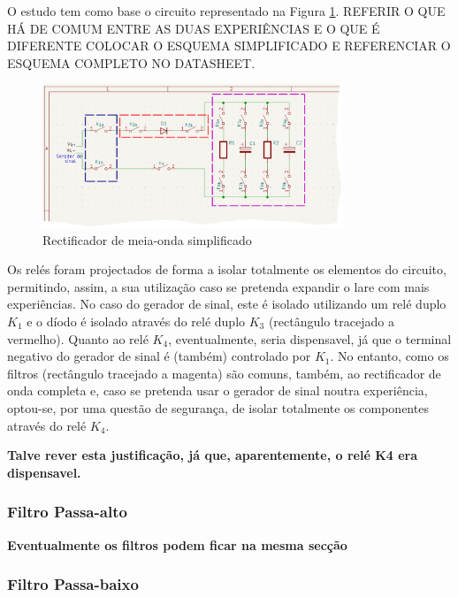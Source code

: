 O estudo tem como base o circuito representado na Figura \ref{fig:meiaondasimplificado}.
REFERIR O QUE HÁ DE COMUM ENTRE AS DUAS EXPERIÊNCIAS E O QUE É DIFERENTE
COLOCAR O ESQUEMA SIMPLIFICADO E REFERENCIAR O ESQUEMA COMPLETO NO DATASHEET.

\begin{figure}[hbtp]
	\centering
	\includegraphics[width=0.8\textwidth]{figures/MeiaOndaSimplificado.png}
	\caption{Rectificador de meia-onda simplificado}
	\label{fig:meiaondasimplificado}
\end{figure}

Os relés foram projectados de forma a isolar totalmente os elementos do circuito, permitindo, assim, a sua utilização caso se pretenda expandir o \acrshort{lare} com mais experiências. No caso do gerador de sinal, este é isolado utilizando um relé duplo $K_{1}$ e o díodo é isolado através do relé duplo $K_{3}$ (rectângulo tracejado a vermelho). Quanto ao relé $K_{4}$, eventualmente, seria dispensavel, já que o terminal negativo do gerador de sinal é (também) controlado por $K_{1}$. No entanto, como os filtros (rectângulo tracejado a magenta) são comuns,  também, ao rectificador de onda completa e, caso se pretenda usar o gerador de sinal noutra experiência, optou-se, por uma questão de segurança, de isolar totalmente os componentes através do relé $K_{4}$.

\textbf{Talve rever esta justificação, já que, aparentemente, o relé K4 era dispensavel.}

\subsubsection{Filtro Passa-alto}
\label{sec:passa-alto}
\textbf{Eventualmente os filtros podem ficar na mesma secção}
\subsubsection{Filtro Passa-baixo}
\label{sec:passa-baixo}


